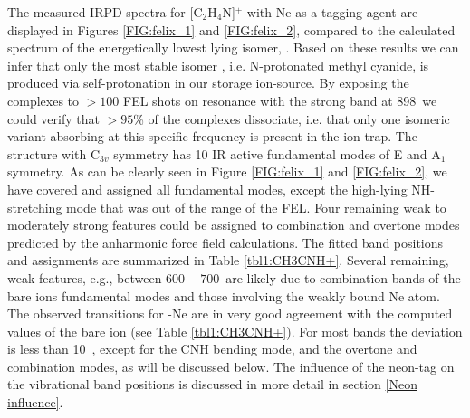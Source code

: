 The measured IRPD spectra for [C$_2$H$_4$N]$^+$  with Ne as a tagging agent are displayed in Figures \ref{FIG:felix_1} and \ref{FIG:felix_2}, compared to the calculated spectrum of the energetically lowest lying isomer, \pan. Based on these results we can infer that only the most stable isomer \pa, i.e. N-protonated methyl cyanide, is produced via self-protonation in our storage ion-source. By exposing the complexes to $>100$ FEL shots on resonance with the strong band at 898~\wnn we could verify that $>95$\% of the complexes dissociate, i.e. that only one isomeric variant absorbing at this specific frequency is present in the ion trap. The \pa structure with C$_{3v}$ symmetry has 10 IR active fundamental modes of E and A$_1$ symmetry. As can be clearly seen in Figure \ref{FIG:felix_1} and \ref{FIG:felix_2}, we have covered and assigned all fundamental modes, except the high-lying NH-stretching mode that was out of the range of the FEL. Four remaining weak to moderately strong features could be assigned to combination and overtone modes predicted by the anharmonic force field calculations. The fitted band positions and assignments are summarized in Table \ref{tbl1:CH3CNH+}.
Several remaining, weak features, e.g., between $600-700$~\wnn are likely due to combination bands of the bare ions fundamental modes and those involving the weakly bound Ne atom. The observed transitions for \pan-Ne are in very good agreement with the computed values of the  bare ion \pa (see Table \ref{tbl1:CH3CNH+}). For most bands the deviation is less than 10~\wn, except for the CNH bending mode, and the overtone and combination modes, as will be discussed below. The influence of the neon-tag on the vibrational band positions is discussed in more detail in section \ref{Neon influence}.

